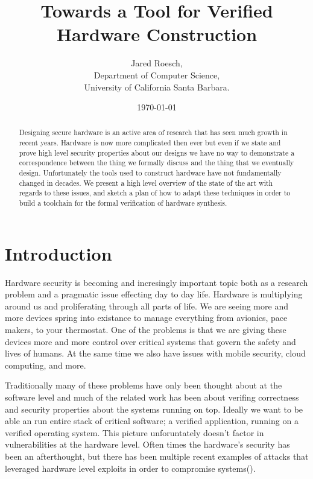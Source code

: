 \documentclass[12pt, titlepage]{article}
\title{Towards a Tool for Verified Hardware Construction}
\author{Jared Roesch,  \\
    Department of Computer Science, \\
    University of California Santa Barbara. \\
    }
\date{\today}
\begin{document}
\maketitle

\begin{abstract}
Designing secure hardware is an active area of research that has seen much growth in recent years.
Hardware is now more complicated then ever but even if we state and prove high level security 
properties about our designs we have no way to demonstrate a correspondence between the thing
we formally discuss and the thing that we eventually design. Unfortunately the tools used to construct hardware
have not fundamentally changed in decades. We present a high level overview of the state of the art with regards to these 
issues, and sketch a plan of how to adapt these techniques in order to build a toolchain for
the formal verification of hardware synthesis.
\end{abstract}


\section{Introduction}

Hardware security is becoming and incresingly important topic both as a research problem and a pragmatic issue effecting 
day to day life. Hardware is multiplying around us and proliferating through all parts of life. We are seeing more and more
devices spring into existance to manage everything from avionics, pace makers, to your thermostat. One of the problems is
that we are giving these devices more and more control over critical systems that govern the safety and lives of humans. At
the same time we also have issues with mobile security, cloud computing, and more.

Traditionally many of these problems have only been thought about at the software level and much of the related work has
been about verifing correctness and security properties about the systems running on top. Ideally we want to be able an
run entire stack of critical software; a verified application, running on a verified operating system. This picture
unforuntately doesn't factor in vulnerabilities at the hardware level. Often times the hardware's security has been
an afterthought, but there has been multiple recent examples of attacks that leveraged hardware level exploits in order
to compromise systems().
\end{document}
